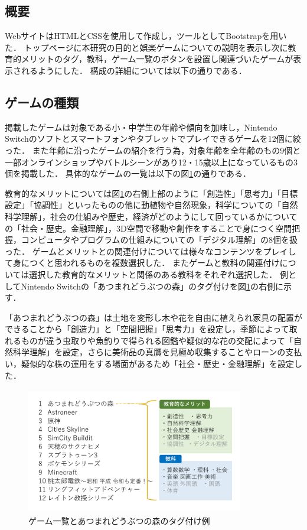 \documentclass[12pt,a4j,titlepage]{ltjsarticle}
\begin{document}
\subsection{概要}
WebサイトはHTMLとCSSを使用して作成し，ツールとしてBootstrapを用いた．
トップページに本研究の目的と娯楽ゲームについての説明を表示し次に教育的メリットのタグ，教科，ゲーム一覧のボタンを設置し関連づいたゲームが表示されるようにした．
構成の詳細については以下の通りである．

\subsection{ゲームの種類}
掲載したゲームは対象である小・中学生の年齢や傾向を加味し，Nintendo Switchのソフトとスマートフォンやタブレットでプレイできるゲームを12個に絞った．
また年齢に沿ったゲームの紹介を行う為，対象年齢を全年齢のもの9個と一部オンラインショップやバトルシーンがあり12・15歳以上になっているもの3個を掲載した．
具体的なゲームの一覧は以下の図\ref{fig:ゲーム一覧}の通りである．

教育的なメリットについては図\ref{fig:ゲーム一覧}の右側上部のように「創造性」「思考力」「目標設定」「協調性」といったものの他に動植物や自然現象，科学についての「自然科学理解」，社会の仕組みや歴史，経済がどのようにして回っているかについての「社会・歴史。金融理解」，3D空間で移動や創作をすることで身につく空間把握，コンピュータやプログラムの仕組みについての「デジタル理解」の8個を扱った．
ゲームとメリットとの関連付けについては様々なコンテンツをプレイして身につくと思われるものを複数選択した．
またゲームと教科の関連付けについては選択した教育的なメリットと関係のある教科をそれぞれ選択した．
例としてNintendo Switchの「あつまれどうぶつの森」のタグ付けを図\ref{fig:ゲーム一覧}の右側に示す．

「あつまれどうぶつの森」は土地を変形し木や花を自由に植えられ家具の配置ができることから「創造力」と「空間把握」「思考力」を設定し，季節によって取れるものが違う虫取りや魚釣りで得られる図鑑や疑似的な花の交配によって「自然科学理解」を設定，さらに美術品の真贋を見極め収集することやローンの支払い，疑似的な株の運用をする場面があるため「社会・歴史・金融理解」を設定した．

\vspace{1zh}
\begin{figure}[h]
\begin{center}
 \includegraphics[clip,width=95mm,height=55mm]{games.pdf}
\end{center}
 \caption{ゲーム一覧とあつまれどうぶつの森のタグ付け例}
 \label{fig:ゲーム一覧}
\end{figure}
\end{document}
